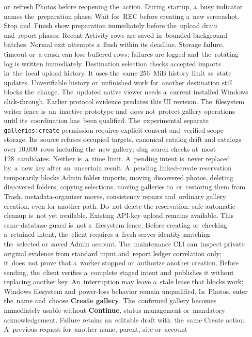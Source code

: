 \documentclass[11pt,a4paper]{article}
\newcommand{\ui}[1]{\textbf{#1}}
\begin{document}
or~refresh Photos before reopening the~action.
During startup, a~busy indicator names the~preparation phase. Wait for~REC
before creating a~new screenshot. Stop and~Finish show preparation immediately
before the~upload drain and~report phases.
Recent Activity rows are saved in~bounded background batches. Normal exit
attempts a~flush within its deadline. Storage failure, timeout or~a crash can
lose buffered rows; failures are logged and~the~rotating log is written
immediately.
Destination selection checks accepted imports in~the~local upload history.
It uses the~same 256~MiB history limit as~state updates. Unverifiable history
or~unfinished work for~another destination still blocks the~change.
The~updated native viewer needs a~current installed
Windows click-through. Earlier protocol evidence predates this UI revision.
The~filesystem writer fence is~an~inactive prototype and~does not~protect
gallery operations until its~coordination has~been qualified.
The~experimental separate \texttt{galleries:create} permission requires
explicit consent and~verified scope storage. Its~source refuses occupied targets, canonical catalog drift and
catalogs over 10,000~rows including the~new gallery; slug search checks at~most
128~candidates. Neither is~a~time limit.
A~pending intent is~never replaced by~a~new key after an~uncertain result.
A~pending linked-create reservation temporarily blocks Admin folder imports,
moving discovered photos, deleting discovered folders, copying selections,
moving galleries to~or~restoring them from Trash, metadata-organizer moves,
consistency repairs and~ordinary gallery creation, even for
another path. Do~not delete the
reservation: safe automatic cleanup is~not yet available. Existing API-key
upload remains available. This same-database guard is~not a~filesystem fence.
Before creating or~checking a~retained intent, the~client requires a~fresh
server identity matching the~selected or~saved Admin account.
The~maintenance CLI can~inspect private original evidence from standard input
and~report ledger correlation only; it~does~not prove that a~worker stopped
or~authorize another creation.
Before sending, the~client verifies a~complete staged intent and~publishes it
without replacing another key. An~interruption may leave a~stale lease that
blocks work; Windows filesystem and~power-loss behavior remain unqualified.
In~Photos, enter the~name and~choose \ui{Create gallery}. The~confirmed gallery
becomes immediately usable without \ui{Continue}, status management
or~mandatory acknowledgement. Failure retains an~editable draft with~the~same
Create action. A~previous request for~another name, parent, site or~account
\end{document}
